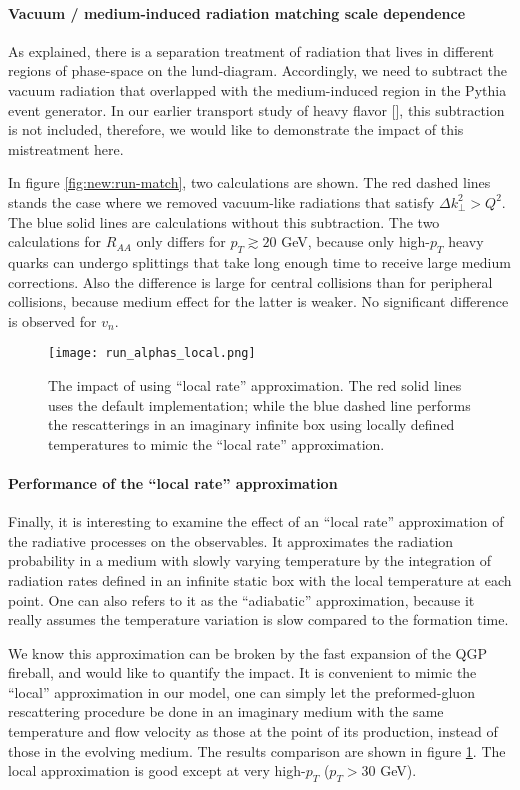 \paragraph{Vacuum / medium-induced radiation matching scale dependence}
As explained, there is a separation treatment of radiation that lives in different regions of phase-space on the lund-diagram.
Accordingly, we need to subtract the vacuum radiation that overlapped with the medium-induced region in the Pythia event generator.
In our earlier transport study of heavy flavor [], this subtraction is not included, therefore, we would like to demonstrate the impact of this mistreatment here.

In figure \ref{fig:new:run-match}, two calculations are shown. 
The red dashed lines stands the case where we removed vacuum-like radiations that satisfy $\Delta k_\perp^2 > Q^2$.
The blue solid lines are calculations without this subtraction.
The two calculations for $R_{AA}$ only differs for $p_T\gtrsim 20$ GeV, because only high-$p_T$ heavy quarks can undergo splittings that take long enough time to receive large medium corrections.
Also the difference is large for central collisions than for peripheral collisions, because medium effect for the latter is weaker.
No significant difference is observed for $v_n$.

\begin{figure}
\centering
\texttt{[image: run\_alphas\_local.png]}
\caption{The impact of using ``local rate'' approximation. The red solid lines uses the default implementation; while the blue dashed line performs the rescatterings in an imaginary infinite box using locally defined temperatures to mimic the ``local rate'' approximation.}
\label{fig:new:run-local}
\end{figure}

\paragraph{Performance of the ``local rate'' approximation}
Finally, it is interesting to examine the effect of an ``local rate'' approximation of the radiative processes on the observables.
It approximates the radiation probability in a medium with slowly varying temperature by the integration of radiation rates defined in an infinite static box with the local temperature at each point.
One can also refers to it as the ``adiabatic'' approximation, because it really assumes the temperature variation is slow compared to the formation  time.

We know this approximation can be broken by the fast expansion of the QGP fireball, and would like to quantify the impact.
It is convenient to mimic the ``local'' approximation in our model, one can simply let the preformed-gluon rescattering procedure be done in an imaginary medium with the same temperature and flow velocity as those at the point of its production, instead of those in the evolving medium.
The results comparison are shown in figure \ref{fig:new:run-local}.
The local approximation is good except at very high-$p_T$ ($p_T > 30$ GeV).

